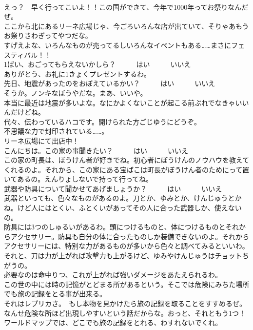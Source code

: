 \documentclass[8pt]{extreport}
\begin{document}
\begin{CJK}{UTF8}{min}
\\	えっ？　早く行ってこいよ！！この国ができて、今年で1000年ってお祭りなんだぜ。	
\\	ここから北にあるリーネ広場じゃ、今ごろいろんな店が出ていて、そりゃあもうお祭りさわぎってやつだな。	
\\	すげえよな、いろんなものが売ってるしいろんなイベントもある……まさにフェスティバル！！	
\\	1ぱい、おごってもらえないかしら？　　　はい　　　いいえ	
\\	ありがとう、お礼に1きょくプレゼントするわ。	
\\	先日、地震があったのをおぼえているかい？　　　はい　　　いいえ	
\\	そうか。ノンキなぼうやだな。まあ、いいや。	
\\	本当に最近は地震が多いよな。なにかよくないことが起こる前ぶれでなきゃいいんだけどね。	
\\	代々、伝わっているハコです。開けられた方ごじゆうにどうぞ。	
\\	不思議な力で封印されている……。	
\\	リーネ広場にて出店中！	
\\	こんにちは。この家の事聞きたい？　　　はい　　　いいえ	
\\	この家の町長は、ぼうけん者が好きでね。初心者にぼうけんのノウハウを教えてくれるのよ。それから、この家にある宝ばこは町長がぼうけん者のためにって置いてあるの。えんりょしないで持って行ってね。	
\\	武器や防具について聞かせてあげましょうか？　　　はい　　　いいえ	
\\	武器といっても、色々なものがあるのよ。刀とか、ゆみとか、けんじゅうとかね。けど人にはとくい、ふとくいがあってその人に合った武器しか、使えないの。	
\\	防具には3つのしゅるいがあるわ。頭につけるものと、体につけるものとそれからアクセサリー。防具も自分の体に合ったものしか装備できないのよ。それからアクセサリーには、特別な力があるものが多いから色々と調べてみるといいわ。	
\\	それと、刀は力が上がれば攻撃力も上がるけど、ゆみやけんじゅうはチョットちがうの。	
\\	必要なのは命中りつ、これが上がれば強いダメージをあたえられるわ。	
\\	この世の中には時の記憶がとどまる所があるという。そこでは危険にみちた場所でも旅の記録をとる事が出来る。	
\\	それはレプリカさ。　もし本物を見かけたら旅の記録を取ることをすすめるぜ。なんせ危険な所ほど出現しやすいという話だからな。おっと、それともう1つ！ワールドマップでは、どこでも旅の記録をとれる、わすれないでくれ。	

\end{CJK}
\end{document}
